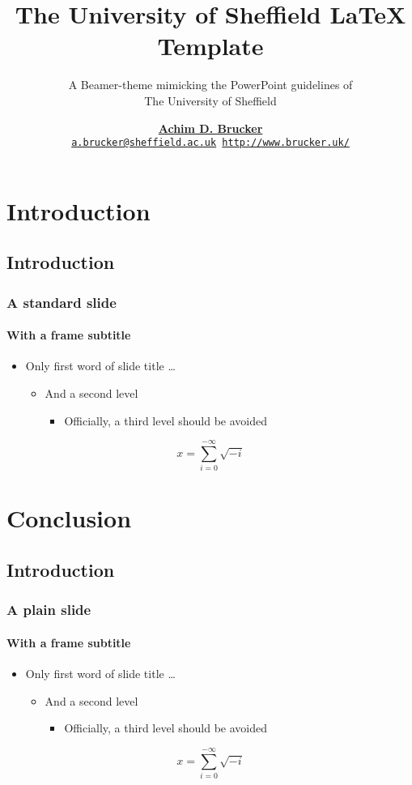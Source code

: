 \documentclass[aspectratio=169]{tuos-presentation}
\title{The University of Sheffield \LaTeX{} Template}
\subtitle{A Beamer-theme mimicking the PowerPoint guidelines of \\The
  University of Sheffield}
\institute[The University of Sheffield]
{Department of Computer Science, The University of Sheffield, Sheffield, UK}
\author[A.D. Brucker] {%
    \href{http://www.brucker.uk/}{\textbf{Achim D. Brucker}}\\
    \texttt{\footnotesize\href{mailto:"Achim D. Brucker"
        <a.brucker@sheffield.ac.uk>}{a.brucker@sheffield.ac.uk}
      \hspace{.6cm}
      \url{http://www.brucker.uk/}}
    }
\begin{document}
\begin{frame}
  \maketitle
\end{frame}

\AgendaFrame

\section{Introduction}
\subsection{Introduction}
\begin{frame}
  \frametitle{A standard slide}
  \framesubtitle{With a frame subtitle}
  \begin{itemize}
  \item Only first word of slide title \ldots
    \begin{itemize}
    \item  And a second level 
      \begin{itemize}
      \item  Officially, a third level should be avoided
      \end{itemize}
    \end{itemize}
  \end{itemize}
  \[ x = \sum_{i=0}^{-\infty}\sqrt{-i}\]
\end{frame}

\section{Conclusion}
\subsection{Introduction}

\begin{frame}[plain]
  \frametitle{A plain slide}
  \framesubtitle{With a frame subtitle}
  \begin{itemize}
  \item Only first word of slide title \ldots
    \begin{itemize}
    \item  And a second level 
      \begin{itemize}
      \item  Officially, a third level should be avoided
      \end{itemize}
    \end{itemize}
  \end{itemize}
  \[ x = \sum_{i=0}^{-\infty}\sqrt{-i}\]
\end{frame}




\ThanksFrame

\CopyrightFrame
\end{document}
